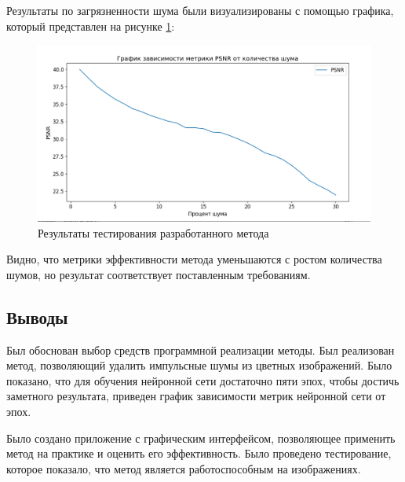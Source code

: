 \newpage
Результаты по загрязненности шума были визуализированы с помощью графика, который представлен на рисунке \ref{tech::test}:
\FloatBarrier
\begin{figure}[h]	
	\begin{center}
		\includegraphics[width=\linewidth]{inc/png/testing1.png}
	\end{center}
	\captionsetup{justification=centering}
	\caption{Результаты тестирования разработанного метода}
	\label{tech::test}
\end{figure}
\FloatBarrier

Видно, что метрики эффективности метода уменьшаются с ростом количества шумов, но результат соответствует поставленным требованиям.

\subsection*{Выводы}
Был обоснован выбор средств программной реализации методы.
Был реализован метод, позволяющий удалить импульсные шумы из цветных изображений.
Было показано, что для обучения нейронной сети достаточно пяти эпох, чтобы достичь заметного результата, приведен график зависимости метрик нейронной сети от эпох.

Было создано приложение с графическим интерфейсом, позволяющее применить метод на практике и оценить его эффективность.
Было проведено тестирование, которое показало, что метод является работоспособным на изображениях.